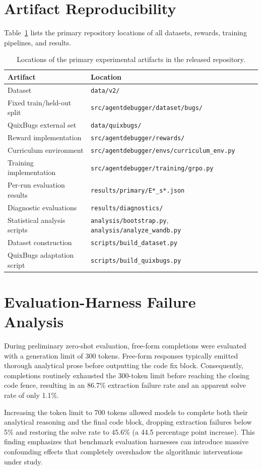 \documentclass{article}
\begin{document}
\section{Artifact Reproducibility}
\label{app:artifact}

Table~\ref{tab:artifacts} lists the primary repository locations of all datasets, rewards, training pipelines, and results.

\begin{table}[h]
\centering
\small
\begin{tabular}{ll}
\toprule
\textbf{Artifact} & \textbf{Location} \\
\midrule
Dataset & \texttt{data/v2/} \\
Fixed train/held-out split & \texttt{src/agentdebugger/dataset/bugs/} \\
QuixBugs external set & \texttt{data/quixbugs/} \\
Reward implementation & \texttt{src/agentdebugger/rewards/} \\
Curriculum environment & \texttt{src/agentdebugger/envs/curriculum\_env.py} \\
Training implementation & \texttt{src/agentdebugger/training/grpo.py} \\
Per-run evaluation results & \texttt{results/primary/E*\_s*.json} \\
Diagnostic evaluations & \texttt{results/diagnostics/} \\
Statistical analysis scripts & \texttt{analysis/bootstrap.py}, \texttt{analysis/analyze\_wandb.py} \\
Dataset construction & \texttt{scripts/build\_dataset.py} \\
QuixBugs adaptation script & \texttt{scripts/build\_quixbugs.py} \\
\bottomrule
\end{tabular}
\caption{Locations of the primary experimental artifacts in the released repository.}
\label{tab:artifacts}
\end{table}

\section{Evaluation-Harness Failure Analysis}
\label{app:harness}

During preliminary zero-shot evaluation, free-form completions were evaluated with a generation limit of 300 tokens. Free-form responses typically emitted thorough analytical prose before outputting the code fix block. Consequently, completions routinely exhausted the 300-token limit before reaching the closing code fence, resulting in an 86.7\% extraction failure rate and an apparent solve rate of only 1.1\%. 

Increasing the token limit to 700 tokens allowed models to complete both their analytical reasoning and the final code block, dropping extraction failures below 5\% and restoring the solve rate to 45.6\% (a 44.5 percentage point increase). This finding emphasizes that benchmark evaluation harnesses can introduce massive confounding effects that completely overshadow the algorithmic interventions under study.
\end{document}

